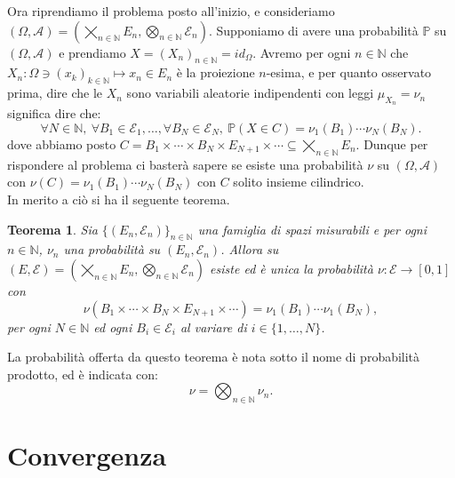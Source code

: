 \documentclass[11pt]{book}
\theoremstyle{Definizione}
\theoremstyle{TeoremaProposizioneLemmaCorollario}
\newtheorem{myteo}{Teorema}[section]
\theoremstyle{OsservazioneNota}
\newcommand{\N}{\mathbb{N}}
\newcommand{\id}[1]{id_{{#1}}}
\renewcommand{\P}{\mathbb{P}}
\begin{document}
Ora riprendiamo il problema posto all'inizio, e consideriamo $(\Omega,\mathcal{A}) = (\bigtimes_{n\in \N} E_n,\bigotimes_{n\in \N} \mathcal{E}_n)$. Supponiamo di avere una probabilità $\P$ su $(\Omega,\mathcal{A})$ e prendiamo $X = (X_{n})_{n\in \N} = \id{\Omega}$. Avremo per ogni $n\in \N$ che $X_n :\Omega \ni (x_k)_{k\in \N}\longmapsto x_n\in E_n$ è la proiezione $n$-esima, e per quanto osservato prima, dire che le $X_{n}$ sono variabili aleatorie indipendenti con leggi $\mu_{X_n} = \nu_n$ significa dire che:
$$
\forall N\in \N,\ \forall B_1\in \mathcal{E}_1,\dots,\forall B_N\in \mathcal{E}_N,\ \P(X\in C) = \nu_1(B_1)\cdots\nu_N(B_N).
$$
dove abbiamo posto $C = B_1\times \cdots \times B_N \times E_{N+1}\times \cdots\subseteq \bigtimes_{n\in \N} E_n$. Dunque per rispondere al problema ci basterà sapere se esiste una probabilità $\nu$ su $(\Omega,\mathcal{A})$ con $\nu(C) = \nu_1(B_1)\cdots\nu_N(B_N)$ con $C$ solito insieme cilindrico.\\
In merito a ciò si ha il seguente teorema.
\begin{boxteo}{}
\begin{myteo}
Sia $\{(E_n,\mathcal{E}_n)\}_{n\in \N}$ una famiglia di spazi misurabili e per ogni $n\in \N$, $\nu_n$ una probabilità su $(E_n,\mathcal{E}_n)$. Allora su $(E,\mathcal{E}) = (\bigtimes_{n\in \N} E_n,\bigotimes_{n\in \N} \mathcal{E}_n)$ esiste ed è unica la probabilità $\nu:\mathcal{E}\longrightarrow [0,1]$ con 
$$
\nu(B_1\times \cdots \times B_N \times E_{N+1} \times \cdots ) = \nu_1(B_1)\cdots \nu_1(B_N),
$$
per ogni $N\in \N$ ed ogni $B_i\in \mathcal{E}_i$ al variare di $i\in \{1,\dots,N\}$.
\end{myteo}
\end{boxteo}
\noindent
La probabilità offerta da questo teorema è nota sotto il nome di probabilità prodotto, ed è indicata con:
$$
\nu = \bigotimes_{n\in \N} \nu_n.
$$
\chapter{Convergenza}
\end{document}
